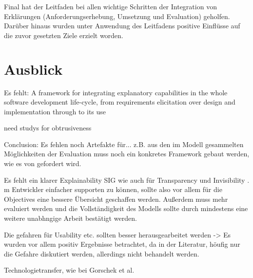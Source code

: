Final hat der Leitfaden bei allen wichtige Schritten der Integration von Erklärungen (Anforderungserhebung, Umsetzung und Evaluation) geholfen. Darüber hinaus wurden unter Anwendung des Leitfadens positive Einflüsse auf die zuvor gesetzten Ziele erzielt worden. 

\section{Ausblick}



Es fehlt: A framework for integrating explanatory capabilities in the whole software development life-cycle, from requirements elicitation over design and implementation through to its use \cite{cassens_ambient_2019}

need studys for obtrusiveness \cite{lim_2009_assessing}

Conclusion: Es fehlen noch Artefakte für... z.B. aus den im Modell gesammelten Möglichkeiten der Evaluation muss noch ein konkretes Framework gebaut werden, wie es von \citeauthor{sokol_explainability_2020} gefordert wird.

Es fehlt ein klarer Explainability SIG wie auch für Transparency \cite{do2010software} und Invisibility \cite{carvalho2020developers}. m Entwickler einfacher supporten zu können, sollte also vor allem für die Objectives eine bessere Übersicht geschaffen werden.
Außerdem muss mehr evaluiert werden und die Vollständigkeit des Modells sollte durch mindestens eine weitere unabhngige Arbeit bestätigt werden.

Die gefahren für Usability etc. sollten besser herausgearbeitet werden -> Es wurden vor allem positiv Ergebnisse betrachtet, da in der Literatur, höufig nur die Gefahre diskutiert werden, allerdings nicht behandelt werden.

Technologietransfer, wie bei Gorschek et al.

